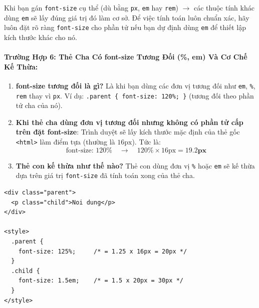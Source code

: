 \documentclass[11pt,oneside]{book}
\newcommand{\codeinline}[1]{\textcolor{accentOrange}{\texttt{#1}}}
\begin{document}
\begin{noteBox}
Khi bạn gán \codeinline{font-size} cụ thể (dù bằng \codeinline{px}, \codeinline{em} hay \codeinline{rem}) $\rightarrow$ các thuộc tính khác dùng \codeinline{em} sẽ lấy đúng giá trị đó làm cơ sở. Để việc tính toán luôn chuẩn xác, hãy luôn đặt rõ ràng \codeinline{font-size} cho phần tử nếu bạn dự định dùng \codeinline{em} để thiết lập kích thước khác cho nó.
\end{noteBox}

\paragraph{Trường Hợp 6: Thẻ Cha Có font-size Tương Đối (\%, em) Và Cơ Chế Kế Thừa:}
\begin{enumerate}[leftmargin=1.5em, itemsep=2pt, parsep=0pt]
    \item \textbf{font-size tương đối là gì?} Là khi bạn dùng các đơn vị tương đối như \codeinline{em}, \codeinline{\%}, \codeinline{rem} thay vì \codeinline{px}. Ví dụ: \codeinline{.parent \{ font-size: 120\%; \}} (tương đối theo phần tử cha của nó).
    \item \textbf{Khi thẻ cha dùng đơn vị tương đối nhưng không có phần tử cấp trên đặt font-size}: Trình duyệt sẽ lấy kích thước mặc định của thẻ gốc \codeinline{<html>} làm điểm tựa (thường là $16\text{px}$). Tức là:
    \[
    \text{font-size: 120\%} \quad \rightarrow \quad 120\% \times 16\text{px} = \mathbf{19.2\text{px}}
    \]
    \item \textbf{Thẻ con kế thừa như thế nào?} Thẻ con dùng đơn vị \codeinline{\%} hoặc \codeinline{em} sẽ kế thừa dựa trên giá trị \codeinline{font-size} đã tính toán xong của thẻ cha.
\end{enumerate}

\begin{codeWindow}
\begin{lstlisting}[language=HTML5]
<div class="parent">
  <p class="child">Noi dung</p>
</div>

<style>
  .parent {
    font-size: 125%;     /* = 1.25 x 16px = 20px */
  }
  .child {
    font-size: 1.5em;    /* = 1.5 x 20px = 30px */
  }
</style>
\end{lstlisting}
\end{codeWindow}
\end{document}
